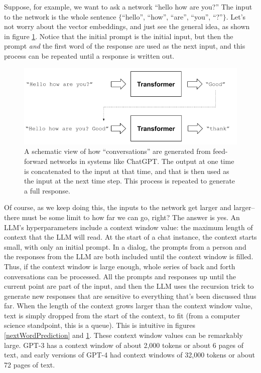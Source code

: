 Suppose, for example, we want to ask a network ``hello how are you?'' The input
to the network is the whole sentence $\{$``hello'', ``how'', ``are'', ``you'',
``?''$\}$. Let's  not worry about the vector embeddings, and just see the
general idea, as shown in figure \ref{gptRecursedInputs}. Notice that the
initial prompt is the initial input, but then the prompt \emph{and} the first
word of the response are used as the next input, and this process can be
repeated until a response is written out.
  
\begin{figure}[ht]
\centering
\includegraphics[scale=.7]{./images/gptRecursedInputs.png}
\caption[Jeff Yoshimi]{A schematic view of how ``conversations'' are generated
from feed-forward networks in systems like ChatGPT. The output at one time is
concatenated to the input at that time, and that is then used as the input at
the next time step. This process is repeated to generate a full response.
}
\label{gptRecursedInputs}
\end{figure}

Of course, as we keep doing this, the inputs to the network get larger and
larger--there must be some limit to how far we can go, right? The answer is
yes. An LLM's hyperparameters include a context window value: the
maximum length of context that the LLM will read. At the start of a chat
instance, the context starts small, with only an initial prompt. In a dialog,
the prompts from a person and the responses from the LLM are both included
until the context window is filled. Thus, if the context window is large
enough, whole series of back and forth conversations can be processed. All the
prompts and responses up until the current point are part of the input, and
then the LLM uses the recursion trick to generate new responses that are
sensitive to everything that's been discussed thus far. When the length of the
context grows larger than the context window value, text is simply dropped from
the start of the context, to fit (from a computer science standpoint, this is a
queue). This is intuitive in figures \ref{nextWordPrediction} and
\ref{gptRecursedInputs}. These context window values can be remarkably large.
GPT-3 has a context window of about 2,000 tokens or about 6 pages of text, and
early versions of GPT-4 had context windows of 32,000 tokens or about 72 pages
of text.

